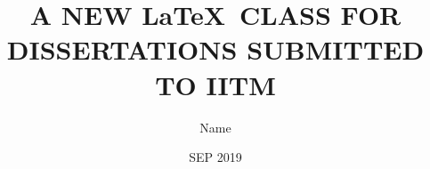 
\title{A NEW \LaTeX\ CLASS FOR DISSERTATIONS SUBMITTED TO IITM}

\author{Name}

\date{SEP 2019}


\maketitle